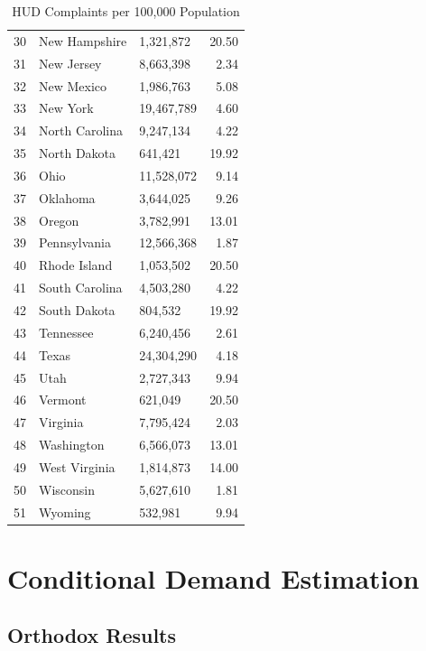 \documentclass{article}
\begin{document}
\begin{table}[ht]
\begin{tabular}{rllr}
  30 & New Hampshire & 1,321,872 & 20.50 \\ 
  31 & New Jersey & 8,663,398 & 2.34 \\ 
  32 & New Mexico & 1,986,763 & 5.08 \\ 
  33 & New York & 19,467,789 & 4.60 \\ 
  34 & North Carolina & 9,247,134 & 4.22 \\ 
  35 & North Dakota & 641,421 & 19.92 \\ 
  36 & Ohio & 11,528,072 & 9.14 \\ 
  37 & Oklahoma & 3,644,025 & 9.26 \\ 
  38 & Oregon & 3,782,991 & 13.01 \\ 
  39 & Pennsylvania & 12,566,368 & 1.87 \\ 
  40 & Rhode Island & 1,053,502 & 20.50 \\ 
  41 & South Carolina & 4,503,280 & 4.22 \\ 
  42 & South Dakota & 804,532 & 19.92 \\ 
  43 & Tennessee & 6,240,456 & 2.61 \\ 
  44 & Texas & 24,304,290 & 4.18 \\ 
  45 & Utah & 2,727,343 & 9.94 \\ 
  46 & Vermont & 621,049 & 20.50 \\ 
  47 & Virginia & 7,795,424 & 2.03 \\ 
  48 & Washington & 6,566,073 & 13.01 \\ 
  49 & West Virginia & 1,814,873 & 14.00 \\ 
  50 & Wisconsin & 5,627,610 & 1.81 \\ 
  51 & Wyoming & 532,981 & 9.94 \\ 
   \hline
\end{tabular}
\caption{HUD Complaints per 100,000 Population} 
\label{tab:HUDComplaints}
\end{table}
\section{Conditional Demand Estimation}

  \subsection{Orthodox Results}
  
\end{document}
